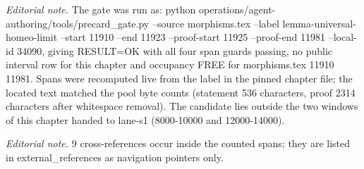 \documentclass[10pt,a4paper]{amsart}
\theoremstyle{plain}
\theoremstyle{definition}
\theoremstyle{remark}
\numberwithin{equation}{subsection}
\begin{document}
\noindent\textit{Editorial note.} The gate was run as: python operations/agent-authoring/tools/precard\_gate.py --source morphisms.tex --label lemma-universal-homeo-limit --start 11910 --end 11923 --proof-start 11925 --proof-end 11981 --local-id 34090, giving RESULT=OK with all four span guards passing, no public interval row for this chapter and occupancy FREE for morphisms.tex 11910 11981. Spans were recomputed live from the label in the pinned chapter file; the located text matched the pool byte counts (statement 536 characters, proof 2314 characters after whitespace removal). The candidate lies outside the two windows of this chapter handed to lane-s1 (8000-10000 and 12000-14000).\par\medskip
\noindent\textit{Editorial note.} 9 cross-references occur inside the counted spans; they are listed in external\_references as navigation pointers only.\par\medskip
\end{document}
